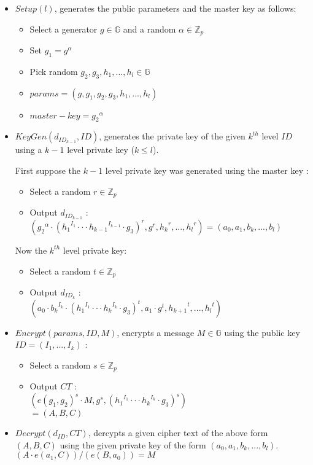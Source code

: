 \begin{itemize}
\item $Setup (l)$, generates the public parameters and the master key as follows:
\begin{itemize}
	\item Select a generator $g \in \mathbb{G}$ and a random $\alpha \in \mathbb{Z}_p$
	\item Set $g_1 = g^{\alpha}$
	\item Pick random $g_2, g_3, h_1, ..., h_l \in \mathbb{G}$
	\item $params = (g, g_1, g_2, g_3, h_1, ..., h_l)$
	\item $master-key = {g_2}^{\alpha}$
\end{itemize}	
\item $KeyGen(d_{{ID}_{k-1}}, ID)$, generates the private key of the given $k^{th}$ level $ID$ using a $k-1$ level private key ($k \leq l$).

First suppose the $k-1$ level private key was generated using the master key :
\begin{itemize}
	\item Select a random $r \in \mathbb{Z}_p$ 
	\item Output $d_{{ID}_{k-1}}$ : \\
	$({{g_2}^{\alpha}} \cdot {({{h_1}^{I_1}\cdot \cdot \cdot {h_{k-1}}^{I_{k-1}}} \cdot {g_3} )}^r , g^r, {h_{k}}^r, ... , {h_l}^r) = (a_0, a_1, b_k, ... , b_l)$
\end{itemize}	

Now the $k^{th}$ level private key:
\begin{itemize}
	\item Select a random $t \in \mathbb{Z}_p$ 
	\item Output $d_{{ID}_{k}}$ : \\
	$({{a_0}\cdot{{b_k}^{I_k}}} \cdot {({{h_1}^{I_1}\cdot \cdot \cdot {h_k}^{I_k}} \cdot {g_3} )}^t , {a_1}\cdot{g^t}, {h_{k+1}}^t, ... , {h_l}^t)$
\end{itemize}	

\item $Encrypt (params, ID, M)$, encrypts a message $M \in \mathbb{G}$ using the public key $ID = (I_1, ..., I_k)$ :

\begin{itemize}
	\item Select a random $s \in \mathbb{Z}_p$ 
	\item Output $CT$ : \\
	$(e(g_1, g_2)^s \cdot M,  g^s,  {({{h_1}^{I_1}\cdot \cdot \cdot {h_k}^{I_k}} \cdot {g_3} )}^s)$\\$=(A, B, C)$
\end{itemize}	


\item $Decrypt (d_{ID}, CT)$, dercypts a given cipher text of the above form $(A, B, C)$ using the given private key of the form $(a_0, a_1, b_k, ... , b_l)$. \\
$(A \cdot e(a_1, C))/(e(B, a_0)) = M$
\end{itemize}
